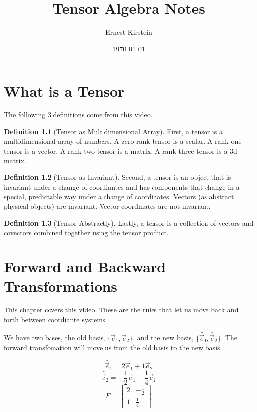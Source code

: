 \documentclass[12pt]{book}
\title{%
  Tensor Algebra Notes
}
\author{Ernest Kirstein}
\date{\today}
\theoremstyle{plain}
\theoremstyle{definition}
\newtheorem{definition}{Definition}[chapter]
\theoremstyle{ppart}
\theoremstyle{case}
\theoremstyle{solution}
\begin{document}
\maketitle

\tableofcontents

\chapter{What is a Tensor}

The following 3 definitions come from this \cite{youtube:tensor0} video.

\begin{definition}[Tensor as Multidimensional Array]
First, a tensor is a multidimensional array of numbers.
A zero rank tensor is a scalar. A rank one tensor is a vector. A rank two tensor is a matrix. A rank three tensor is a 3d matrix.
\end{definition}

\begin{definition}[Tensor as Invariant]
Second, a tensor is an object that is invariant under a change of coordiantes and has components that change in a special, predictable
way under a change of coordinates.
Vectors (as abstract physical objects) are invariant. Vector coordinates are not invariant.
\end{definition}

\begin{definition}[Tensor Abstractly]
Lastly, a tensor is a collection of vectors and covectors combined together using the tensor product.
\end{definition}

\chapter{Forward and Backward Transformations}

This chapter covers this \cite{youtube:tensor1} video.
These are the rules that let us move back and forth between coordiante systems.

We have two bases, the old basis, $\{\vec{e}_1, \vec{e}_2\}$, and the new basis, $\{\widetilde{\vec{e}_1}, \widetilde{\vec{e}_2}\}$.
The forward transfomation will move us from the old basis to the new basis.

\[ \widetilde{\vec{e}_1} = 2 \vec{e}_1 + 1 \vec{e}_2 \]
\[ \widetilde{\vec{e}_2} = -\frac{1}{2} \vec{e}_1 + \frac{1}{4} \vec{e}_2 \]
\[
  F =
  \begin{bmatrix}
  2 & -\frac{1}{2} \\
  1 & \frac{1}{4}
  \end{bmatrix}
\]
\end{document}
